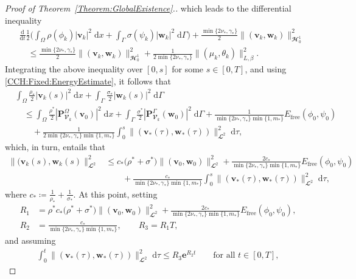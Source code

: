 \documentclass[10pt,reqno]{amsart}
\theoremstyle{remark}
\numberwithin{equation}{section}
\newcommand{\abs}[1]{| #1 |}
\newcommand{\norm}[1]{\| #1 \|}
\newcommand{\bv}{\mathbf{v}}
\newcommand{\bw}{\mathbf{w}}
\newcommand{\intO}{\int_\Omega}
\newcommand{\intG}{\int_\Gamma}
\newcommand{\dtau}{\;\mathrm d\tau}
\newcommand{\dx}{\;\mathrm{d}x}
\newcommand{\dG}{\;\mathrm d\Ga}
\newcommand{\ddt}{\frac{\mathrm d}{\mathrm dt}}
\newcommand{\e}{\mathbf{e}}
\newcommand{\Om}{\Omega}
\newcommand{\Ga}{\Gamma}
\begin{document}
\begin{proof}[Proof of Theorem~\ref{Theorem:GlobalExistence}.]
which leads to the differential inequality
\begin{align*}
    &\ddt\frac12\Big(\intO \rho(\phi_k)\abs{\bv_k}^2\dx + \intG \sigma(\psi_k)\abs{\bw_k}^2\dG\Big) + \frac{\min\{2\nu_\ast,\gamma_\ast\}}{2}\norm{(\bv_k,\bw_k)}_{\mathbfcal{H}^1_{0}}^2 \\
    &\quad\leq \frac{\min\{2\nu_\ast,\gamma_\ast\}}{2}\norm{(\bv_k,\bw_k)}_{\mathbfcal{H}^1_{0}}^2 + \frac{1}{2\min\{2\nu_\ast,\gamma_\ast\}}\norm{(\mu_k,\theta_k)}_{L,\beta}^2.
\end{align*}
Integrating the above inequality over $[0,s]$ for some $s\in[0,T]$, and using \eqref{CCH:Fixed:EnergyEstimate}, it follows that
\begin{align*}
    &\intO \frac{\rho_\ast}{2}\abs{\bv_k(s)}^2\dx + \intG \frac{\sigma_\ast}{2}\abs{\bw_k(s)}^2\dG \\
    &\quad\leq \intO \frac{\rho^\ast}{2}\abs{\mathbf{P}_{\mathbfcal{V}_k}^\Om(\bv_0)}^2\dx + \intG \frac{\sigma^\ast}{2}\abs{\mathbf{P}_{\mathbfcal{V}_k}^\Ga(\bw_0)}^2\dG + \frac{1}{\min\{2\nu_\ast,\gamma_\ast\}\min\{1,m_\ast\}}E_{\mathrm{free}}(\phi_0,\psi_0) \\
    &\qquad + \frac{1}{2\min\{2\nu_\ast,\gamma_\ast\}\min\{1,m_\ast\}}\int_0^s \norm{(\bv_\ast(\tau),\bw_\ast(\tau))}_{\mathbfcal{L}^2}^2\dtau,
\end{align*}
which, in turn, entails that
\begin{align}\label{Est:vw:m:int:-1}
    \norm{(\bv_k(s),\bw_k(s)}_{\mathbfcal{L}^2}^2 &\leq c_\ast\big(\rho^\ast + \sigma^\ast)\norm{(\bv_0,\bw_0)}_{\mathbfcal{L}^2}^2 + \frac{2c_\ast}{\min\{2\nu_\ast,\gamma_\ast\}\min\{1,m_\ast\}}E_{\mathrm{free}}(\phi_0,\psi_0) \\
    &\qquad + \frac{c_\ast}{\min\{2\nu_\ast,\gamma_\ast\}\min\{1,m_\ast\}}\int_0^s \norm{(\bv_\ast(\tau),\bw_\ast(\tau))}_{\mathbfcal{L}^2}^2\dtau, \nonumber
\end{align}
where $c_\ast \coloneqq \tfrac{1}{\rho_\ast} + \tfrac{1}{\sigma_\ast}$. At this point, setting
\begin{align*}
    R_1 &= \rho^\ast c_\ast\big(\rho^\ast + \sigma^\ast)\norm{(\bv_0,\bw_0)}_{\mathbfcal{L}^2}^2 + \frac{2c_\ast}{\min\{2\nu_\ast,\gamma_\ast\}\min\{1,m_\ast\}}E_{\mathrm{free}}(\phi_0,\psi_0), \\
    R_2 &= \frac{c_\ast}{\min\{2\nu_\ast,\gamma_\ast\}\min\{1,m_\ast\}}, \qquad R_3 = R_1T,
\end{align*}
and assuming
\begin{align}\label{Assump:vw:_star}
    \int_0^t \norm{(\bv_\ast(\tau),\bw_\ast(\tau))}_{\mathbfcal{L}^2}^2\dtau \leq R_3 \e^{R_2t}\qquad\text{for all~}t\in[0,T],

\end{align}
\end{proof}
\end{document}
